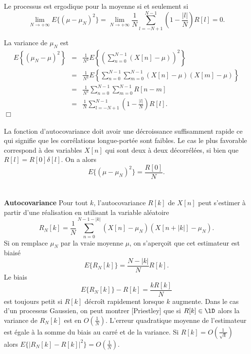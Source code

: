 \begin{proposition}
Le processus est ergodique pour la moyenne si et seulement si
\[
\lim_{N \rightarrow +\infty} E\{(\mu -  \mu_N)^2\} = 
\lim_{N \rightarrow +\infty} 
\frac 1 N \sum_{l=-N+1}^{N-1} (1 - \frac {|l|} N) R[l] = 0.
\]
\end{proposition}

La variance de $ \mu_N$ est
\begin{eqnarray}
E\left \{ \left( \mu_N - \mu \right)^2\right\}
& = & \frac 1 {N^2} 
E \left \{ \left(\sum_{n=0}^{N-1} (X[n] - \mu)\right)^2 \right\} \\
& = & \frac 1 {N^2} 
E \left \{ \sum_{n=0}^{N-1} \sum_{m=0}^{N-1} 
(X[n] - \mu) (X[m] - \mu) \right \} \\
& = & \frac 1 {N^2} 
\sum_{n=0}^{N-1} \sum_{m=0}^{N-1} R[n-m] \\ 
& = &
\frac 1 N \sum_{l=-N+1}^{N-1} (1 - \frac {|l|} N) R[l].
\end{eqnarray}
$\Box$\\
\\

La fonction d'autocovariance doit avoir une d\'ecroissance
suffisamment rapide ce qui signifie que les corr\'elations 
longue-port\'ee sont faibles. Le cas le plus favorable correspond \`a
des variables $X[n]$ qui sont deux \`a deux d\'ecorr\'el\'ees, 
si bien que
$R[l] = R[0] \delta[l]$.
On a alors 
\[
E\{(\mu -  \mu_N)^2\} = \frac {R[0]} N .
\]
\\
\\
{\bf Autocovariance}
Pour tout $k$, l'autocovariance $R[k]$ de $X[n]$
peut s'estimer \`a partir
d'une r\'ealisation en utilisant la variable al\'eatoire
\begin{equation}
\label{biais}
 R_N [k] = \frac 1 {N}
\sum_{n=0}^{N-1-|k|} (X[n] -  \mu_N) (X[n+|k|] -  \mu_N).
\end{equation}
Si on remplace $ \mu_N$ par la vraie moyenne $\mu$, on
s'aper\c{c}oit que cet estimateur est biais\'e
\[
E\{  R_N [k]\} = \frac {N-|k|} N R[k].
\]
Le biais 
\[
E\{R_N [k]\} - R[k] = \frac {k R [k]} {N} 
\]
est toujours petit si $R[k]$ d\'ecro\^it rapidement lorsque $k$
augmente.
Dans le cas d'un processus Gaussien, on peut montrer [Priestley] que
si $R[k] \in \lD$ alors la variance de $R_N [k]$
est en $O(\frac 1 N)$.
L'erreur quadratique moyenne de l'estimateur est \'egale 
\`a la somme du biais au carr\'e et de la variance.
Si $R[k] = O(\frac 1 {\sqrt k})$ alors
$E\{|R_N [k] - R[k]|^2\} =  O(\frac 1 N)$.

